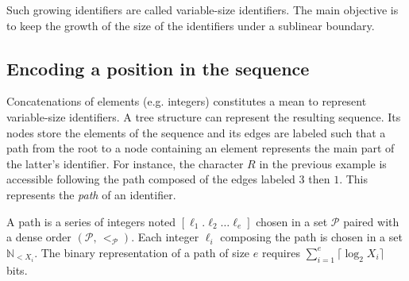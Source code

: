 
Such growing identifiers are called variable-size identifiers. The main
objective is to keep the growth of the size of the identifiers under a sublinear
boundary.

\subsection{Encoding a position in the sequence}
\label{subsec:variable}

Concatenations of elements (e.g. integers) constitutes a mean to represent
variable-size identifiers.
A tree structure can represent the resulting sequence. Its nodes store the
elements of the sequence and its edges are labeled such that a path from the
root to a node containing an element represents the main part of the latter's
identifier. For instance, the character $R$ in the previous example is
accessible following the path composed of the edges labeled $3$ then $1$.  This
represents the \emph{path} of an identifier.



\begin{definition}[Path]
  A path is a series of integers noted $[\ell_1.\ell_2\ldots \ell_e]$ chosen in a
  set $\mathcal{P}$ paired with a dense order $(\mathcal{P},\, <_\mathcal{P})$.
  Each integer $\ell_i$ composing the path is chosen in a set
  $\mathbb{N}_{<X_i}$. The binary representation of a path of size $e$ requires
  $\textstyle \sum\nolimits_{i=1}^e \lceil \log_2 X_i\rceil$ bits.
\end{definition}


